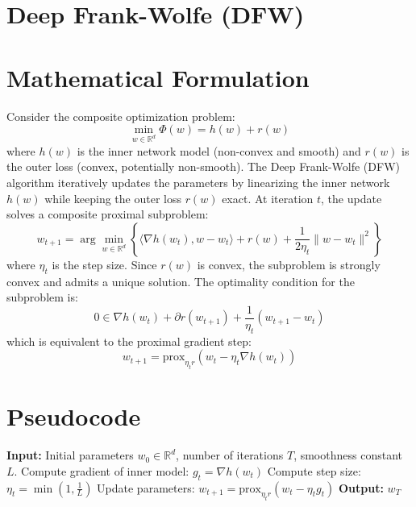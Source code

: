 \documentclass{article}
\begin{document}
\section*{Deep Frank-Wolfe (DFW)}

\section*{Mathematical Formulation}
Consider the composite optimization problem:
\begin{equation}
    \min_{w \in \mathbb{R}^d} \Phi(w) = h(w) + r(w)
\end{equation}
where $h(w)$ is the inner network model (non-convex and smooth) and $r(w)$ is the outer loss (convex, potentially non-smooth). The Deep Frank-Wolfe (DFW) algorithm iteratively updates the parameters by linearizing the inner network $h(w)$ while keeping the outer loss $r(w)$ exact. At iteration $t$, the update solves a composite proximal subproblem:
\begin{equation}
    w_{t+1} = \arg\min_{w \in \mathbb{R}^d} \left\{ \langle \nabla h(w_t), w - w_t \rangle + r(w) + \frac{1}{2\eta_t} \|w - w_t\|^2 \right\}
\end{equation}
where $\eta_t$ is the step size. Since $r(w)$ is convex, the subproblem is strongly convex and admits a unique solution. %
The optimality condition for the subproblem is:
\begin{equation}
    0 \in \nabla h(w_t) + \partial r(w_{t+1}) + \frac{1}{\eta_t}(w_{t+1} - w_t)
\end{equation}
which is equivalent to the proximal gradient step:
\begin{equation}
    w_{t+1} = \text{prox}_{\eta_t r}(w_t - \eta_t \nabla h(w_t))
\end{equation}

\section*{Pseudocode}
\begin{algorithmic}[1]
\State \textbf{Input:} Initial parameters $w_0 \in \mathbb{R}^d$, number of iterations $T$, smoothness constant $L$.
    \State Compute gradient of inner model: $g_t = \nabla h(w_t)$
    \State Compute step size: $\eta_t = \min\left(1, \frac{1}{L}\right)$ %
    \State Update parameters: $w_{t+1} = \text{prox}_{\eta_t r}(w_t - \eta_t g_t)$
\EndFor
\State \textbf{Output:} $w_T$
\end{algorithmic}
\end{document}
